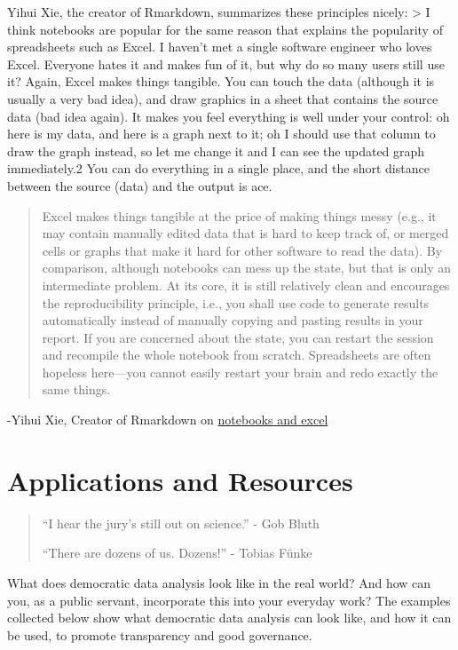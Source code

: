\documentclass[
]{book}
\begin{document}
Yihui Xie, the creator of Rmarkdown, summarizes these principles nicely:
\textgreater{} I think notebooks are popular for the same reason that explains the popularity of spreadsheets such as Excel. I haven't met a single software engineer who loves Excel. Everyone hates it and makes fun of it, but why do so many users still use it? Again, Excel makes things tangible. You can touch the data (although it is usually a very bad idea), and draw graphics in a sheet that contains the source data (bad idea again). It makes you feel everything is well under your control: oh here is my data, and here is a graph next to it; oh I should use that column to draw the graph instead, so let me change it and I can see the updated graph immediately.2 You can do everything in a single place, and the short distance between the source (data) and the output is ace.

\begin{quote}
Excel makes things tangible at the price of making things messy (e.g., it may contain manually edited data that is hard to keep track of, or merged cells or graphs that make it hard for other software to read the data). By comparison, although notebooks can mess up the state, but that is only an intermediate problem. At its core, it is still relatively clean and encourages the reproducibility principle, i.e., you shall use code to generate results automatically instead of manually copying and pasting results in your report. If you are concerned about the state, you can restart the session and recompile the whole notebook from scratch. Spreadsheets are often hopeless here---you cannot easily restart your brain and redo exactly the same things.
\end{quote}

-Yihui Xie, Creator of Rmarkdown on \href{https://yihui.org/en/2018/09/notebook-war/}{notebooks and excel}

\hypertarget{applications-and-resources}{%
\chapter{Applications and Resources}\label{applications-and-resources}}

\begin{quote}
``I hear the jury's still out on science.'' - Gob Bluth

``There are dozens of us. Dozens!'' - Tobias Fünke
\end{quote}

What does democratic data analysis look like in the real world? And how can you, as a public servant, incorporate this into your everyday work? The examples collected below show what democratic data analysis can look like, and how it can be used, to promote transparency and good governance.
\end{document}
